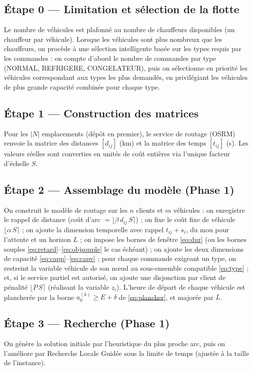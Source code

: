 \documentclass[12pt,a4paper]{report}
\begin{document}
\subsection*{Étape 0 --- Limitation et sélection de la flotte}
Le nombre de véhicules est plafonné au nombre de chauffeurs disponibles (un chauffeur par véhicule). Lorsque les véhicules sont plus nombreux que les chauffeurs, on procède à une sélection intelligente basée sur les types requis par les commandes : on compte d'abord le nombre de commandes par type (NORMAL, REFRIGERE, CONGELATEUR), puis on sélectionne en priorité les véhicules correspondant aux types les plus demandés, en privilégiant les véhicules de plus grande capacité combinée pour chaque type.

\subsection*{Étape 1 --- Construction des matrices}
Pour les $|N|$ emplacements (dépôt en premier), le service de routage
(OSRM) renvoie la matrice des distances $[d_{ij}]$ (km) et la matrice
des temps $[t_{ij}]$ (s). Les valeurs réelles sont converties en unités de
coût entières via l'unique facteur d'échelle $S$.

\subsection*{Étape 2 --- Assemblage du modèle (Phase 1)}
On construit le modèle de routage sur les $n$ clients et $m$ véhicules : on
enregistre le rappel de distance (coût d'arc $= \lfloor \beta\, d_{ij}\, S
\rceil$) ; on fixe le coût fixe de véhicule $\lfloor \alpha\, S \rceil$ ; on
ajoute la dimension temporelle avec rappel $t_{ij} + s_i$, du mou pour
l'attente et un horizon $L$ ; on impose les bornes de fenêtre \eqref{eq:dur}
(ou les bornes souples \eqref{eq:retard}--\eqref{eq:objsouple} le cas
échéant) ; on ajoute les deux dimensions de capacité
\eqref{eq:capp}--\eqref{eq:capv} ; pour chaque commande exigeant un type, on
restreint la variable véhicule de son nœud au sous-ensemble compatible
\eqref{eq:type} ; et, si le service partiel est autorisé, on ajoute une
disjonction par client de pénalité $\lfloor P\, S \rceil$ (réalisant la
variable $z_i$). L'heure de départ de chaque véhicule est plancher\-ée par la
borne $a_0^{(k)} \geq E + \delta$ de \eqref{eq:plancher}, et majorée par $L$.

\subsection*{Étape 3 --- Recherche (Phase 1)}
On génère la solution initiale par l'heuristique du plus proche arc, puis on
l'améliore par Recherche Locale Guidée \cite{voudouris1999} sous la limite de
temps (ajustée à la taille de l'instance).
\end{document}
